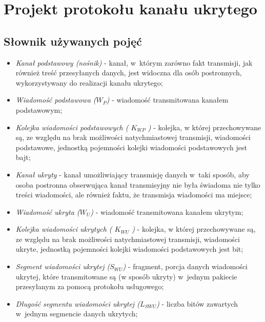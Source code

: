 \documentclass[a4paper, twoside, 12pt]{report}
\begin{document}
\chapter{Projekt protokołu kanału ukrytego}
    \section{Słownik używanych pojęć} \label{DICT}
    \begin{itemize}
        \item \emph{Kanał podstawowy (nośnik)} - kanał, w~którym zarówno fakt transmisji,
            jak również treść przesyłanych danych, jest widoczna dla osób postronnych,
            wykorzystywany do realizacji kanału ukrytego;

        \item \emph{Wiadomość podstawowa (\(W_P\))} - wiadomość transmitowana kanałem
            podstawowym;

        \item \emph{Kolejka wiadomości podstawowych ( \( K_{WP} \) )} - kolejka, w
                której przechowywane są, ze względu na brak możliwości natychmiastowej
                transmisji, wiadomości podstawowe, jednostką pojemności kolejki
                wiadomości podstawowych jest bajt;

        \item \emph{Kanał ukryty} - kanał umożliwiający transmisję danych w~taki sposób,
            aby osoba postronna obserwująca kanał transmisyjny nie była świadoma
            nie tylko treści wiadomości, ale również faktu, że transmisja wiadomości ma miejsce;

        \item \emph{Wiadomość ukryta (\(W_U\))} - wiadomość transmitowana kanałem ukrytym;

        \item \emph{Kolejka wiadomości ukrytych ( \( K_{WU} \) )} - kolejka, w
                której przechowywane są, ze względu na brak możliwości natychmiastowej
                transmisji, wiadomości ukryte, jednostką pojemności kolejki
                wiadomości podstawowych jest bit;

        \item \emph{Segment wiadomości ukrytej (\(S_{WU}\))} - fragment, porcja danych
            wiadomości ukrytej, które transmitowane są (w sposób ukryty) w~jednym
            pakiecie przesyłanym za pomocą protokołu usługowego;

        \item \emph{Długość segmentu wiadomości ukrytej (\( L_{SWU} \))} - liczba
                bitów zawartych w~jednym segmencie danych ukrytych;


\end{itemize}
\end{document}
